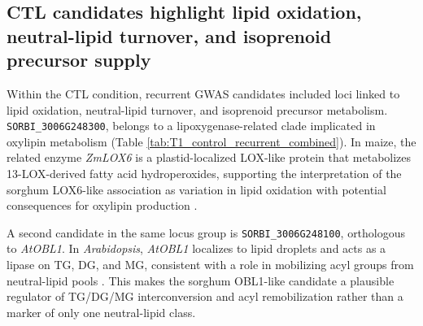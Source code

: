 \documentclass[9pt,twocolumn,twoside]{rilabRxiv}
\begin{document}


\subsection{CTL candidates highlight lipid oxidation, neutral-lipid turnover, and isoprenoid precursor supply}

Within the CTL condition, recurrent GWAS candidates included loci linked to lipid oxidation, neutral-lipid turnover, and isoprenoid precursor metabolism. \texttt{SORBI\_3006G248300}, belongs to a lipoxygenase-related clade implicated in oxylipin metabolism (Table \ref{tab:T1_control_recurrent_combined}). In maize, the related enzyme \textit{ZmLOX6} is a plastid-localized LOX-like protein that metabolizes 13-LOX-derived fatty acid hydroperoxides, supporting the interpretation of the sorghum LOX6-like association as variation in lipid oxidation with potential consequences for oxylipin production \citep{Gao2008ZmLOX6}. 

A second candidate in the same locus group is \texttt{SORBI\_3006G248100}, orthologous to \textit{AtOBL1}. In \textit{Arabidopsis}, \textit{AtOBL1} localizes to lipid droplets and acts as a lipase on TG, DG, and MG, consistent with a role in mobilizing acyl groups from neutral-lipid pools \citep{Muller2018AtOBL1}. This makes the sorghum OBL1-like candidate a plausible regulator of TG/DG/MG interconversion and acyl remobilization rather than a marker of only one neutral-lipid class.
\end{document}
